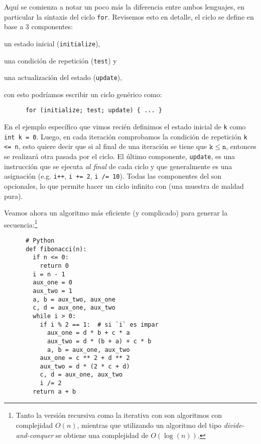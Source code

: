     Aquí se comienza a notar un poco más la diferencia entre ambos lenguajes, en particular la 
    sintaxis del ciclo \texttt{for}.
    Revisemos esto en detalle, el ciclo se define en base a 3 componentes: 
    \begin{inparaenum}[(1)]
      \item un estado inicial (\texttt{initialize}),
      \item una condición de repetición (\texttt{test}) y
      \item una actualización del estado (\texttt{update}),
    \end{inparaenum}
    con esto podríamos escribir un ciclo genérico como:
    
    \begin{verbatim}
      for (initialize; test; update) { ... }
    \end{verbatim}

    En el ejemplo específico que vimos recién definimos el estado inicial de \texttt{k} como 
    \texttt{int k = 0}. 
    Luego, en cada iteración comprobamos la condición de repetición \texttt{k <= n}, esto 
    quiere decir que si al final de una iteración se tiene que \(\mathtt{k} \leq \mathtt{n}\), 
    entonces se realizará otra pasada por el ciclo.
    El último componente, \texttt{update}, es una instrucción que se ejecuta \emph{al final} de cada
    ciclo y que generalmente es una asignación (e.g. \texttt{i++}, \texttt{i += 2}, 
    \texttt{i /= 10}).
    Todas las componentes del  son opcionales, lo que permite hacer un ciclo infinito con
     (una muestra de maldad pura).

    Veamos ahora un algoritmo más eficiente (y complicado) para generar la secuencia:\footnote{Tanto 
    la versión recursiva como la iterativa con  son algoritmos con complejidad \(O(n)\), 
    mientras que utilizando un algoritmo del tipo \textit{divide-and-conquer} se obtiene una 
    complejidad de \(O(\log(n))\).}

    \begin{verbatim}
      # Python
      def fibonacci(n):
        if n <= 0:
          return 0
        i = n - 1
        aux_one = 0
        aux_two = 1
        a, b = aux_two, aux_one
        c, d = aux_one, aux_two
        while i > 0:
          if i % 2 == 1:  # si `i` es impar
            aux_one = d * b + c * a
            aux_two = d * (b + a) + c * b
            a, b = aux_one, aux_two
          aux_one = c ** 2 + d ** 2
          aux_two = d * (2 * c + d)
          c, d = aux_one, aux_two
          i /= 2
        return a + b
    \end{verbatim}

